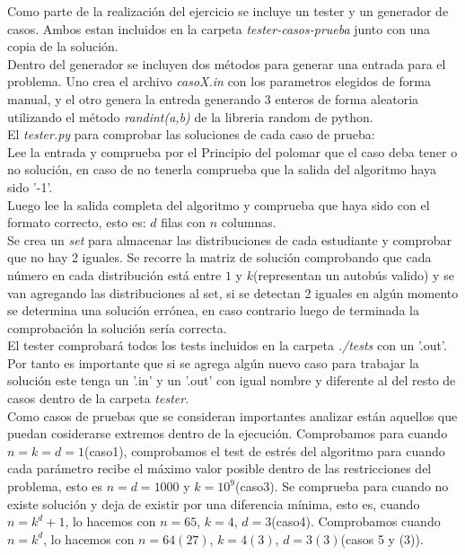\documentclass[12pt]{article}
\begin{document}
 Como parte de la realizaci\'on del ejercicio se incluye un tester y un generador de casos. Ambos estan incluidos en la carpeta \textit{tester-casos-prueba} junto con una copia de la soluci\'on.\\
 Dentro del generador se incluyen dos m\'etodos para generar una entrada para el problema. 
 Uno crea el archivo \textit{casoX.in} con los parametros elegidos de forma manual, y el otro genera la entreda generando 3 enteros de forma aleatoria utilizando el m\'etodo \textit{randint(a,b)} de la libreria random de python.\\
El \textit{tester.py} para comprobar las soluciones de cada caso de prueba:\\
Lee la entrada y comprueba por el Principio del polomar que el caso deba tener o no soluci\'on, en caso de no tenerla comprueba que la salida del algoritmo haya sido '-1'.\\
 Luego lee la salida completa del algoritmo y comprueba que haya sido con el formato correcto, esto es: 
 $d$ filas con $n$ columnas.\\
 Se crea un \textit{set} para almacenar las distribuciones de cada estudiante y comprobar que no hay 2 iguales. Se recorre la matriz de soluci\'on comprobando que cada n\'umero en cada distribuci\'on est\'a 
 entre $1$ y $k$(representan un autob\'us valido) y se van agregando las distribuciones al set, si se detectan 2 iguales en alg\'un momento se determina una soluci\'on err\'onea, en caso contrario luego de terminada la comprobaci\'on la soluci\'on ser\'ia correcta.\\
El tester comprobar\'a todos los tests incluidos en la carpeta \textit{./tests} con un '.out'. Por tanto es importante que si se agrega alg\'un nuevo caso para trabajar la soluci\'on este tenga un '.in' y un '.out' con igual nombre y diferente al del resto de casos dentro de la carpeta \textit{tester}.\\
 Como casos de pruebas que se consideran importantes analizar est\'an aquellos que puedan cosiderarse extremos dentro de la ejecuci\'on. 
 Comprobamos para cuando $n=k=d=1$(caso1), comprobamos el test de estr\'es del algoritmo para cuando cada par\'ametro recibe el m\'aximo valor posible dentro de las restricciones del problema, esto es $n=d=1000$ y $k=10^9$(caso3). 
 Se comprueba para cuando no existe soluci\'on y deja de existir por una diferencia m\'inima, esto es, cuando $n=k^d + 1$, lo hacemos con $n = 65$, $k=4$, $d=3$(caso4). Comprobamos cuando $n=k^d$, lo hacemos con $n=64(27)$, $k=4(3)$, $d=3(3)$(casos 5 y (3)).\\
\end{document}
